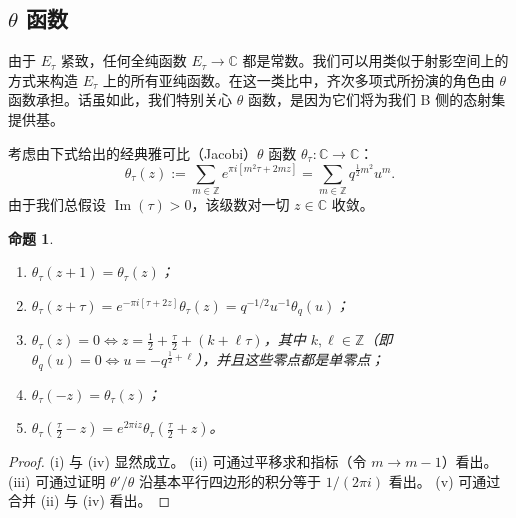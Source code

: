 \documentclass[11pt,a4paper]{article}
\theoremstyle{plain}
\newtheorem{proposition}[theorem]{命题}
\theoremstyle{definition}
\begin{document}
\subsection{$\theta$ 函数}

由于 $E_\tau$ 紧致，任何全纯函数 $E_\tau\to\mathbb{C}$ 都是常数。我们可以用类似于射影空间上的方式来构造 $E_\tau$ 上的所有亚纯函数。在这一类比中，齐次多项式所扮演的角色由 $\theta$ 函数承担。话虽如此，我们特别关心 $\theta$ 函数，是因为它们将为我们 B 侧的态射集提供基。

考虑由下式给出的经典雅可比（Jacobi）$\theta$ 函数 $\theta_\tau\colon\mathbb{C}\to\mathbb{C}$：
\[
\theta_\tau(z):=\sum_{m\in\mathbb{Z}}e^{\pi i[m^2\tau+2mz]}=\sum_{m\in\mathbb{Z}}q^{\frac{1}{2}m^2}u^m .
\]
由于我们总假设 $\operatorname{Im}(\tau)>0$，该级数对一切 $z\in\mathbb{C}$ 收敛。

\begin{proposition}
\begin{enumerate}[label=\roman*)]
  \item $\theta_\tau(z+1)=\theta_\tau(z)$；
  \item $\theta_\tau(z+\tau)=e^{-\pi i[\tau+2z]}\theta_\tau(z)=q^{-1/2}u^{-1}\theta_q(u)$；
  \item $\theta_\tau(z)=0\iff z=\frac{1}{2}+\frac{\tau}{2}+(k+\ell\tau)$，其中 $k,\ell\in\mathbb{Z}$（即 $\theta_q(u)=0\iff u=-q^{\frac{1}{2}+\ell}$），并且这些零点都是单零点；
  \item $\theta_\tau(-z)=\theta_\tau(z)$；
  \item $\theta_\tau(\frac{\tau}{2}-z)=e^{2\pi iz}\theta_\tau(\frac{\tau}{2}+z)$。
\end{enumerate}
\end{proposition}
\begin{proof}
(i) 与 (iv) 显然成立。
(ii) 可通过平移求和指标（令 $m\to m-1$）看出。
(iii) 可通过证明 $\theta'/\theta$ 沿基本平行四边形的积分等于 $1/(2\pi i)$ 看出。
(v) 可通过合并 (ii) 与 (iv) 看出。
\end{proof}
\end{document}
